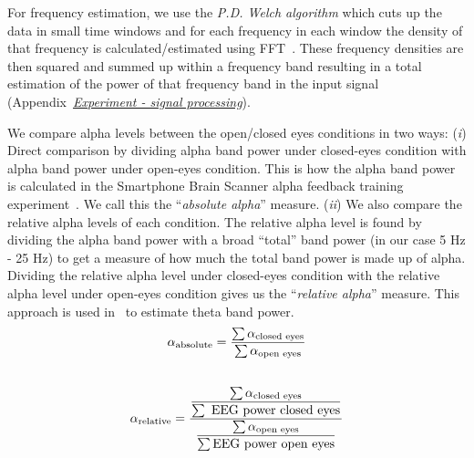 \documentclass[a4paper,10pt,english,lof,lot,twoside]{puthesis}
\begin{document}
For frequency estimation, we use the \emph{P.D. Welch algorithm} which cuts up the data
in small time windows and for each frequency in each window the density of that
frequency is calculated/estimated using FFT \cite{welch_use_1967}. These frequency densities are then squared and summed
up within a frequency band resulting in a total estimation of the power of that
frequency band in the input signal (Appendix {\hyperref[appendix_experiment:appendix-experiment]{\emph{Experiment - signal processing}}}).

We compare alpha levels between the open/closed eyes conditions in two ways:
(\emph{i}) Direct comparison by dividing alpha band power under closed-eyes condition
with alpha band power under open-eyes condition. This is how the alpha band
power is calculated in the Smartphone Brain Scanner alpha feedback training
experiment \cite{stopczynski_smartphones_2013}. We call this the
``\emph{absolute alpha}'' measure. (\emph{ii}) We also compare the relative alpha levels of
each condition. The relative alpha level is found by dividing the alpha band
power with a broad ``total'' band power (in our case 5 Hz - 25 Hz) to get a
measure of how much the total band power is made up of alpha. Dividing the
relative alpha level under closed-eyes condition with the relative alpha level
under open-eyes condition gives us the ``\emph{relative alpha}'' measure. This approach
is used in \cite{finnigan_resting_2011} to estimate theta band power.
\label{ch-experiment/index:equation-eq-absolute-alpha}\begin{gather}
\begin{split}\alpha_\textrm{absolute} = \frac{\sum \alpha_\textrm{closed eyes}} {\sum \alpha_\textrm{open eyes}}\end{split}\label{ch-experiment/index-eq-absolute-alpha}\\\begin{split}\end{split}\notag
\end{gather}\label{ch-experiment/index:equation-eq-relative-alpha}\begin{gather}
\begin{split}\alpha_\textrm{relative} = \frac{\dfrac{\sum \alpha_\textrm{closed eyes}}{\sum \textrm{ EEG power closed eyes} }}{\dfrac{\sum \alpha_\textrm{open eyes}}{ \sum \textrm{EEG power open eyes}}}\end{split}\label{ch-experiment/index-eq-relative-alpha}\\\begin{split}\end{split}\notag
\end{gather}
\end{document}
